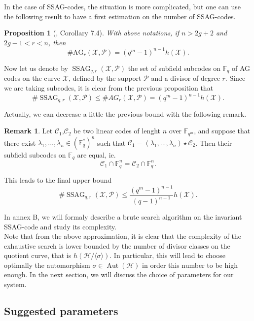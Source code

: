 \documentclass[10pt]{article}
\newtheorem{prop1}[thm]{Proposition}
\theoremstyle{definition}
\newtheorem{rq1}[thm]{Remark}
\theoremstyle{definition}
\theoremstyle{definition}
\newcommand{\s}{\vspace{0.3cm}}
\newcommand{\C}{\mathcal{C}}
\newcommand{\fqm}{\mathbb{F}_{q^m}}
\newcommand{\fq}{\mathbb{F}_q}
\newcommand{\X}{\mathcal{X}}
\newcommand{\PR}{\mathcal{P}}
\newcommand{\Aut}{\operatorname{Aut}}
\newcommand{\ssag}{\operatorname{SSAG}}
\begin{document}
\s

In the case of SSAG-codes, the situation is more complicated, but one can use the following result to have a first estimation on the number of SSAG-codes.

\s

\begin{prop1}[\cite{CMRP}, Corollary 7.4] 
With above notations, if $n>2g+2$ and $2g-1<r<n$, then 
\[\#\mathrm{AG}_r(\X,\PR) = (q^m-1)^{n-1}h(\X).\]
\end{prop1}

Now let us denote by $\ssag_{q,r}(\X,\PR)$ the set of subfield subcodes on $\fq$ of AG codes on the curve $\X$, defined by the support $\PR$ and a divisor of degree $r$. Since we are taking subcodes, it is clear from the previous proposition that 
\[\#\ssag_{q,r}(\X,\PR) \leq \#AG_r(\X,\PR) = (q^m-1)^{n-1}h(\X).\]

Actually, we can decrease a little the previous bound with the following remark.

\s

\begin{rq1}
Let $\C_1$,$\C_2$ be two linear codes of lenght $n$ over $\fqm$, and suppose that there exist $\lambda_1,...,\lambda_n \in (\fq^*)^n$ such that $\C_1 = (\lambda_1,...,\lambda_n) \star \C_2$. Then their subfield subcodes on $\fq$ are equal, ie.
\[\C_1 \cap \fq^n = \C_2 \cap \fq^n.\]
\end{rq1}

\s

This leads to the final upper bound 
\begin{equation} \label{nb of sssag}
 \#\ssag_{q,r}(\X,\PR) \leq \dfrac{(q^m-1)^{n-1}}{(q-1)^{n-1}}h(\X).
\end{equation} 

\s

In annex B, we will formaly describe a brute search algorithm on the invariant SSAG-code and study its complexity. \\
Note that from the above approximation, it is clear that the complexity of the exhaustive search is lower bounded by the number of divisor classes on the quotient curve, that is $h(\mathcal{H}/\langle \sigma \rangle)$. In particular, this will lead to choose optimally the automorphism $\sigma \in \Aut(\mathcal{H})$ in order this number to be high enough. In the next section, we will discuss the choice of parameters for our system.

\s

\subsection{Suggested parameters}
\end{document}
